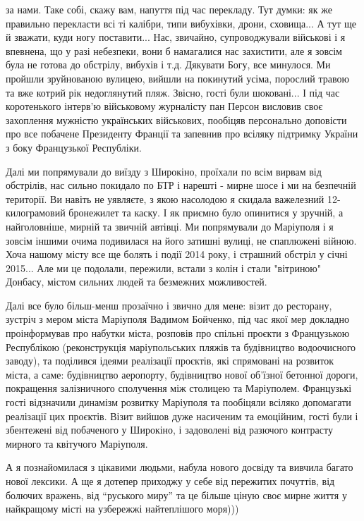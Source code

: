 за нами. Таке собі, скажу вам, напуття під час перекладу. Тут думки: як же
правильно перекласти всі ті калібри, типи вибухівки, дрони, сховища... А тут ще
й зважати, куди ногу поставити... Нас, звичайно, супроводжували військові і я
впевнена, що у разі небезпеки, вони б намагалися нас захистити, але я зовсім
була не готова до обстрілу, вибухів і т.д. Дякувати Богу, все минулося. Ми
пройшли зруйнованою вулицею, вийшли на покинутий усіма, порослий травою та вже
котрий рік недоглянутий пляж. Звісно, гості були шоковані... І під час
коротенького інтерв'ю військовому журналісту пан Персон висловив своє
захоплення мужністю українських військових, пообіцяв персонально доповісти про
все побачене Президенту Франції та запевнив про всіляку підтримку України з
боку Французької Республіки. 

Далі ми попрямували до виїзду з Широкіно, проїхали по всім вирвам від
обстрілів, нас сильно покидало по БТР і нарешті - мирне шосе і ми на безпечній
території. Ви навіть не уявляєте, з якою насолодою я скидала важелезний
12-килограмовий бронежилет та каску. І як приємно було опинитися у зручній, а
найголовніше, мирній та звичній автівці. Ми попрямували до Маріуполя і я зовсім
іншими очима подивилася на його затишні вулиці, не спаплюжені війною. Хоча
нашому місту все ще болять і події 2014 року, і страшний обстріл у січні
2015... Але ми це подолали, пережили, встали з колін і стали "вітриною"
Донбасу, містом сильних людей та безмежних можливостей. 

Далі все було більш-менш прозаїчно і звично для мене: візит до ресторану,
зустріч з мером міста Маріуполя Вадимом Бойченко, під час якої мер докладно
проінформував про набутки міста, розповів про спільні проєкти з Французькою
Республікою (реконструкція маріупольських пляжів та будівництво водоочисного
заводу), та поділився ідеями реалізації проєктів, які спрямовані на розвиток
міста, а саме: будівництво аеропорту, будівництво нової об’їзної бетонної
дороги, покращення залізничного сполучення між столицею та Маріуполем.
Французькі гості відзначили динамізм розвитку Маріуполя та пообіцяли всіляко
допомагати реалізації цих проєктів. Візит вийшов дуже насиченим та емоційним,
гості були і збентежені від побаченого у Широкіно, і задоволені від разючого
контрасту мирного та квітучого Маріуполя. 

А я познайомилася з цікавими людьми, набула нового досвіду та вивчила багато
нової лексики. А ще я дотепер приходжу у себе від пережитих почуттів, від
болючих вражень, від \enquote{руського миру} та це більше ціную своє мирне життя у
найкращому місті на узбережжі найтеплішого моря)))
